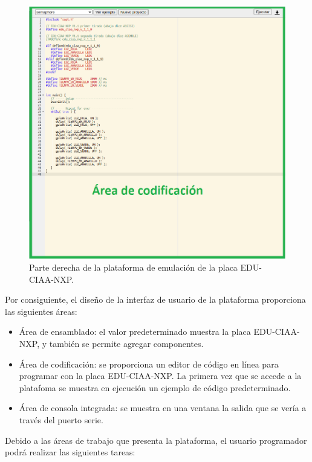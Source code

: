 \begin{figure}[ht]
	\centering
	\includegraphics[scale=.50]{./Figures/PlataformaEmulador2.png}
	\caption{Parte derecha de la plataforma de emulación de la placa EDU-CIAA-NXP.}
	\label{fig:PlataformaEmulador2}
\end{figure}



Por consiguiente, el diseño de la interfaz de usuario de la plataforma proporciona las siguientes áreas:

\begin{itemize}
	\item Área de ensamblado: el valor predeterminado muestra la placa EDU-CIAA-NXP, y también se permite agregar componentes.
	\item Área de codificación: se proporciona un editor de código en línea para programar con la placa EDU-CIAA-NXP. La primera vez que se accede a la platafoma se muestra en ejecución un ejemplo de código predeterminado.
	\item Área de consola integrada: se muestra en una ventana la salida que se vería a través del puerto serie. 
\end{itemize}


Debido a las áreas de trabajo que presenta la plataforma, el
usuario programador podrá realizar las siguientes tareas:

